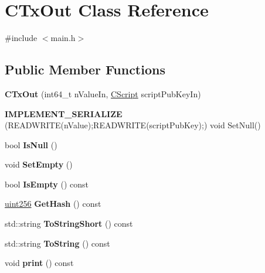 \hypertarget{class_c_tx_out}{}\section{C\+Tx\+Out Class Reference}
\label{class_c_tx_out}


{\ttfamily \#include $<$main.\+h$>$}

\subsection*{Public Member Functions}
\begin{DoxyCompactItemize}
\item 
\mbox{\label{class_c_tx_out_a0c1e679d352cf90a4cca21105604d945}} 
{\bfseries C\+Tx\+Out} (int64\+\_\+t n\+Value\+In, \mbox{\hyperlink{class_c_script}{C\+Script}} script\+Pub\+Key\+In)
\item 
\mbox{\label{class_c_tx_out_a04f89935cbcd7ab133413c35591d72e1}} 
{\bfseries I\+M\+P\+L\+E\+M\+E\+N\+T\+\_\+\+S\+E\+R\+I\+A\+L\+I\+ZE} (R\+E\+A\+D\+W\+R\+I\+TE(n\+Value);R\+E\+A\+D\+W\+R\+I\+TE(script\+Pub\+Key);) void Set\+Null()
\item 
\mbox{\label{class_c_tx_out_a11b9210d1fc174477f99309132edbef7}} 
bool {\bfseries Is\+Null} ()
\item 
\mbox{\label{class_c_tx_out_aef15a8068187af08b25a7ddfbf8d7744}} 
void {\bfseries Set\+Empty} ()
\item 
\mbox{\label{class_c_tx_out_ae5eab8e2d01f678135b8891645db6b78}} 
bool {\bfseries Is\+Empty} () const
\item 
\mbox{\label{class_c_tx_out_af97a27e75b8698951bacc4c5a6ca70af}} 
\mbox{\hyperlink{classuint256}{uint256}} {\bfseries Get\+Hash} () const
\item 
\mbox{\label{class_c_tx_out_ad230d55a8f20f7be629ef0bba5b31c23}} 
std\+::string {\bfseries To\+String\+Short} () const
\item 
\mbox{\label{class_c_tx_out_affdc44390970a14812fe9179768495ef}} 
std\+::string {\bfseries To\+String} () const
\item 
\mbox{\label{class_c_tx_out_a5600592b9eb80dd8662d4195b74cd9ce}} 
void {\bfseries print} () const
\end{DoxyCompactItemize}
